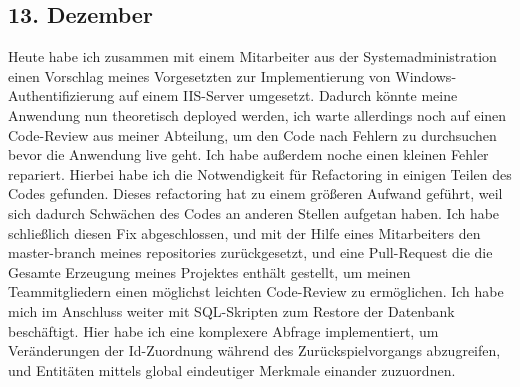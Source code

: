 \subsection{13. Dezember}
Heute habe ich zusammen mit einem Mitarbeiter aus der Systemadministration einen Vorschlag meines Vorgesetzten zur Implementierung von Windows-Authentifizierung auf einem IIS-Server umgesetzt. Dadurch könnte meine Anwendung nun theoretisch deployed werden, ich warte allerdings noch auf einen Code-Review aus meiner Abteilung, um den Code nach Fehlern zu durchsuchen bevor die Anwendung live geht. Ich habe außerdem noche einen kleinen Fehler repariert. Hierbei habe ich die Notwendigkeit für Refactoring in einigen Teilen des Codes gefunden. Dieses refactoring hat zu einem größeren Aufwand geführt, weil sich dadurch Schwächen des Codes an anderen Stellen aufgetan haben. Ich habe schließlich diesen Fix abgeschlossen, und mit der Hilfe eines Mitarbeiters den master-branch meines repositories zurückgesetzt, und eine Pull-Request die die Gesamte Erzeugung meines Projektes enthält gestellt, um meinen Teammitgliedern einen möglichst leichten Code-Review zu ermöglichen.
Ich habe mich im Anschluss weiter mit SQL-Skripten zum Restore der Datenbank beschäftigt. Hier habe ich eine komplexere Abfrage implementiert, um Veränderungen der Id-Zuordnung während des Zurückspielvorgangs abzugreifen, und Entitäten mittels global eindeutiger Merkmale einander zuzuordnen.
